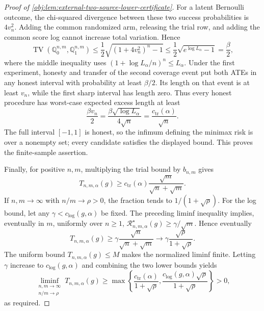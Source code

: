 \begin{proof}[Proof of \cref{obj:lem:external-two-source-lower-certificate}]
For a latent Bernoulli outcome, the chi-squared divergence between these two success probabilities is \(4v_n^2\). Adding the common randomized arm, releasing the trial row, and adding the common score log cannot increase total variation. Hence
\[
\operatorname{TV}(\mathbb Q_0^{n,m},\mathbb Q_1^{n,m})
\le\frac12\sqrt{(1+4v_n^2)^n-1}
\le\frac12\sqrt{e^{\log L_\alpha}-1}
=\frac{\beta}{2},
\]
where the middle inequality uses
\((1+\log L_\alpha/n)^n\le L_\alpha\). Under the first experiment, honesty and transfer of the second coverage event put both ATEs in any honest interval with probability at least \(\beta/2\). Its length on that event is at least \(v_n\), while the first sharp interval has length zero. Thus every honest procedure has worst-case expected excess length at least
\[
\frac{\beta v_n}{2}
=\frac{\beta\sqrt{\log L_\alpha}}{4\sqrt n}
=\frac{c_{\mathrm{tr}}(\alpha)}{\sqrt n}.
\]
The full interval \([-1,1]\) is honest, so the infimum defining the minimax risk is over a nonempty set; every candidate satisfies the displayed bound. This proves the finite-sample assertion.

Finally, for positive \(n,m\), multiplying the trial bound by \(b_{n,m}\) gives
\[
T_{n,m,\alpha}(g)
\ge c_{\mathrm{tr}}(\alpha)
 \frac{\sqrt m}{\sqrt n+\sqrt m}.
\]
If \(n,m\to\infty\) with \(n/m\to\rho>0\), the fraction tends to
\(1/(1+\sqrt\rho)\). For the log bound, let any
\(\gamma<c_{\mathrm{log}}(g,\alpha)\) be fixed. The preceding liminf inequality implies, eventually in \(m\), uniformly over \(n\ge1\),
\(\mathcal R^\star_{n,m,\alpha}(g)\ge\gamma/\sqrt m\). Hence eventually
\[
T_{n,m,\alpha}(g)
\ge \gamma\frac{\sqrt n}{\sqrt n+\sqrt m}
\longrightarrow
\gamma\frac{\sqrt\rho}{1+\sqrt\rho}.
\]
The uniform bound \(T_{n,m,\alpha}(g)\le M\) makes the normalized liminf finite. Letting \(\gamma\) increase to \(c_{\mathrm{log}}(g,\alpha)\) and combining the two lower bounds yields
\[
\liminf_{\substack{n,m\to\infty\\ n/m\to\rho}}
T_{n,m,\alpha}(g)
\ge
\max\left\{
\frac{c_{\mathrm{tr}}(\alpha)}{1+\sqrt\rho},
\frac{c_{\mathrm{log}}(g,\alpha)\sqrt\rho}{1+\sqrt\rho}
\right\}>0,
\]
as required.
\end{proof}
